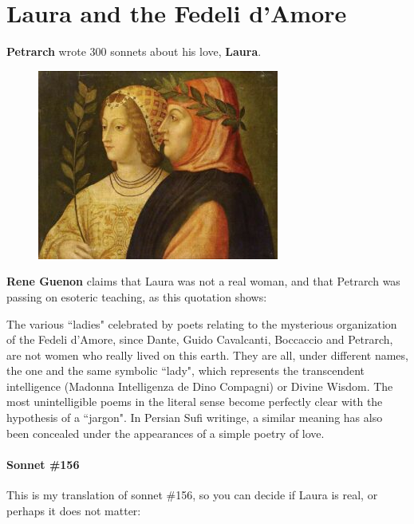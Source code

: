 \section{Laura and the Fedeli d'Amore}

\textbf{Petrarch} wrote 300 sonnets about his love, \textbf{Laura}.

\begin{figure}
 \includegraphics[scale=.45]{a20210623LauraandtheFedelidAmore-img001.jpg} 
\end{figure}

\textbf{Rene Guenon} claims that Laura was not a real woman, and that Petrarch was passing on esoteric teaching, as this quotation shows:

\begin{quotex}

The various ``ladies" celebrated by poets relating to the mysterious organization of the Fedeli d'Amore, since Dante, Guido Cavalcanti, Boccaccio and Petrarch, are not women who really lived on this earth. They are all, under different names, the one and the same symbolic ``lady", which represents the transcendent intelligence (Madonna Intelligenza de Dino Compagni) or Divine Wisdom. The most unintelligible poems in the literal sense become perfectly clear with the hypothesis of a ``jargon". In Persian Sufi writinge, a similar meaning has also been concealed under the appearances of a simple poetry of love. 

\end{quotex}
\paragraph{Sonnet \#156}
This is my translation of sonnet \#156, so you can decide if Laura is real, or perhaps it does not matter:


